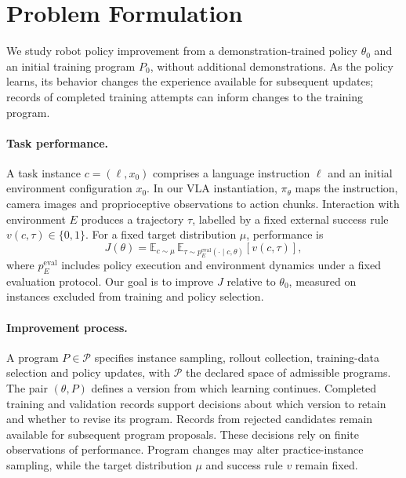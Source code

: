 \section{Problem Formulation}
\label{sec:problem}

We study robot policy improvement from a demonstration-trained policy $\theta_0$ and an initial training program $P_0$, without additional demonstrations. As the policy learns, its behavior changes the experience available for subsequent updates; records of completed training attempts can inform changes to the training program.

\paragraph{Task performance.}
A task instance $c=(\ell,x_0)$ comprises a language instruction $\ell$ and an initial environment configuration $x_0$. In our VLA instantiation, $\pi_\theta$ maps the instruction, camera images and proprioceptive observations to action chunks. Interaction with environment $E$ produces a trajectory $\tau$, labelled by a fixed external success rule $v(c,\tau)\in\{0,1\}$. For a fixed target distribution $\mu$, performance is
\begin{equation}
J(\theta)=\mathbb{E}_{c\sim\mu}\,
\mathbb{E}_{\tau\sim p_E^{\mathrm{eval}}(\cdot\mid c,\theta)}
[v(c,\tau)],
\end{equation}
where $p_E^{\mathrm{eval}}$ includes policy execution and environment dynamics under a fixed evaluation protocol. Our goal is to improve $J$ relative to $\theta_0$, measured on instances excluded from training and policy selection.

\paragraph{Improvement process.}
A program $P\in\mathcal{P}$ specifies instance sampling, rollout collection, training-data selection and policy updates, with $\mathcal{P}$ the declared space of admissible programs. The pair $(\theta,P)$ defines a version from which learning continues. Completed training and validation records support decisions about which version to retain and whether to revise its program. Records from rejected candidates remain available for subsequent program proposals. These decisions rely on finite observations of performance. Program changes may alter practice-instance sampling, while the target distribution $\mu$ and success rule $v$ remain fixed.

